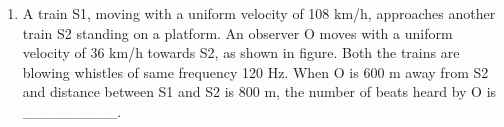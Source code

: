 
\begin{enumerate}
    \item A train S1, moving with a uniform velocity of 108 km/h, approaches another train S2 standing on a platform. An observer O moves with a uniform velocity of 36 km/h towards S2, as shown in figure. Both the trains are blowing whistles of same frequency 120 Hz. When O is 600 m away from S2 and distance between S1 and S2 is 800 m, the number of beats heard by O is \_\_\_\_\_\_\_\_\_. \\
    [Speed of the sound = 330 m/s]
    \begin{center}
    \end{center}
\end{enumerate}
